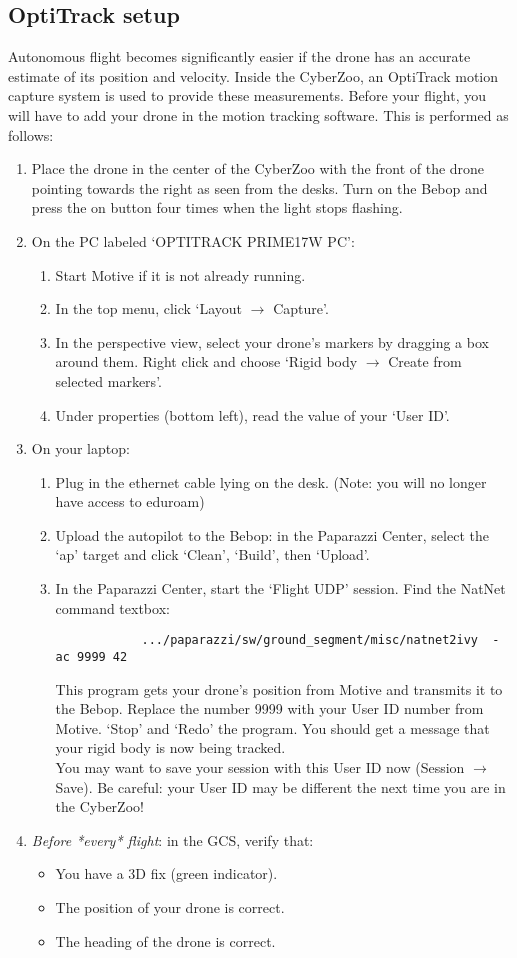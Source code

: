 \subsection*{OptiTrack setup}
Autonomous flight becomes significantly easier if the drone has an accurate estimate of its position and velocity. Inside the CyberZoo, an OptiTrack motion capture system is used to provide these measurements. Before your flight, you will have to add your drone in the motion tracking software. This is performed as follows:
\begin{enumerate}
	\item Place the drone in the center of the CyberZoo with the front of the drone pointing towards the right as seen from the desks. Turn on the Bebop and press the on button four times when the light stops flashing. 
	\item On the PC labeled `OPTITRACK PRIME17W PC':
	\begin{enumerate}
		\item Start Motive if it is not already running.
		\item In the top menu, click `Layout $\rightarrow$ Capture'.
		\item In the perspective view, select your drone's markers by dragging a box around them. Right click and choose `Rigid body $\rightarrow$ Create from selected markers'.
		\item Under properties (bottom left), read the value of your `User ID'.
	\end{enumerate}
	\item On your laptop:
	\begin{enumerate}
		\item Plug in the ethernet cable lying on the desk. (Note: you will no longer have access to eduroam)
		\item Upload the autopilot to the Bebop: in the Paparazzi Center, select the `ap' target and click `Clean', `Build', then `Upload'.
		\item In the Paparazzi Center, start the `Flight UDP' session. Find the NatNet command textbox:
		\begin{verbatim}
			.../paparazzi/sw/ground_segment/misc/natnet2ivy  -ac 9999 42
		\end{verbatim}
		This program gets your drone's position from Motive and transmits it to the Bebop. Replace the number 9999 with your User ID number from Motive. `Stop' and `Redo' the program. You should get a message that your rigid body is now being tracked.\\
		You may want to save your session with this User ID now (Session $\rightarrow$ Save). Be careful: your User ID may be different the next time you are in the CyberZoo!
	\end{enumerate}
	\item \emph{Before *every* flight}: in the GCS, verify that:
	\begin{itemize}
		\item You have a 3D fix (green indicator).
		\item The position of your drone is correct.
		\item The heading of the drone is correct.
	\end{itemize}
\end{enumerate}
	
